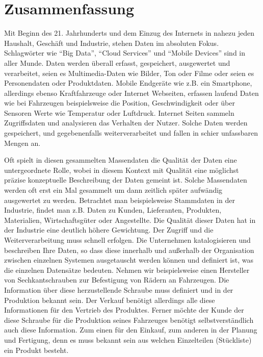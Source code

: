 \chapter*{Zusammenfassung}


Mit Beginn des 21. Jahrhunderts und dem Einzug des Internets in nahezu jeden Haushalt, Geschäft und Industrie, stehen Daten im absoluten Fokus. Schlagwörter wie \enquote{Big Data}, \enquote{Cloud Services} und \enquote{Mobile Devices} sind in aller Munde. Daten werden überall erfasst, gespeichert, ausgewertet und verarbeitet, seien es Multimedia-Daten wie Bilder, Ton oder Filme oder seien es Personendaten oder Produktdaten. Mobile Endgeräte wie z.B. ein Smartphone, allerdings ebenso Kraftfahrzeuge oder Internet Webseiten, erfassen laufend Daten wie bei Fahrzeugen beispielsweise die Position, Geschwindigkeit oder über Sensoren Werte wie Temperatur oder Luftdruck. Internet Seiten sammeln Zugriffsdaten und analysieren das Verhalten der Nutzer. Solche Daten werden gespeichert, und gegebenenfalls weiterverarbeitet und fallen in schier unfassbaren Mengen an. 

Oft spielt in diesen gesammelten Massendaten die Qualität der Daten eine untergeordnete Rolle, wobei in diesem Kontext mit Qualität eine möglichst präzise konzeptuelle Beschreibung der Daten gemeint ist. Solche Massendaten werden oft erst ein Mal gesammelt um dann zeitlich später aufwändig ausgewertet zu werden.
Betrachtet man beispielsweise Stammdaten in der Industrie, findet man z.B. Daten zu Kunden, Lieferanten, Produkten, Materialien, Wirtschaftsgüter oder Angestellte. Die Qualität dieser Daten hat in der Industrie eine deutlich höhere Gewichtung. Der Zugriff und die Weiterverarbeitung muss schnell erfolgen. Die Unternehmen katalogisieren und beschreiben Ihre Daten, so dass diese innerhalb und außerhalb der Organisation zwischen einzelnen Systemen ausgetauscht werden können und definiert ist, was die einzelnen Datensätze bedeuten. Nehmen wir beispielsweise einen Hersteller von Sechkantschrauben zur Befestigung von Rädern an Fahrzeugen. Die Information über diese herzustellende Schraube muss definiert und in der Produktion bekannt sein. Der Verkauf benötigt allerdings alle diese Informationen für den Vertrieb des Produktes. Ferner möchte der Kunde der diese Schraube für die Produktion seines Fahrzeuges benötigt selbstverständlich auch diese Information. Zum einen für den Einkauf, zum anderen in der Planung und Fertigung, denn es muss bekannt sein aus welchen Einzelteilen (Stückliste) ein Produkt besteht. 

